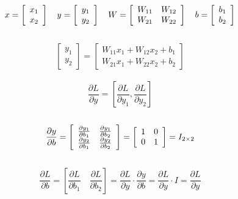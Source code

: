 \documentclass{article}
\begin{document}
\[x = \left[ \begin{array} { c } { x _ { 1 } } \\ { x _ { 2 } } \end{array} \right] \quad y = \left[ \begin{array} { l } { y _ { 1 } } \\ { y _ { 2 } } \end{array} \right] \quad W = \left[ \begin{array} { c c } { W _ { 11 } } & { W _ { 12 } } \\ { W _ { 21 } } & { W _ { 22 } } \end{array} \right] \quad b = \left[ \begin{array} { c } { b _ { 1 } } \\ { b _ { 2 } } \end{array} \right]\]
\\
\[\left[ \begin{array} { l } { y _ { 1 } } \\ { y _ { 2 } } \end{array} \right] = \left[ \begin{array} { c } { W _ { 11 } x _ { 1 } + W _ { 12 } x _ { 2 } + b _ { 1 } } \\ { W _ { 21 } x _ { 1 } + W _ { 22 } x _ { 2 } + b _ { 2 } } \end{array} \right]\]
\\
\[\frac { \partial L } { \partial y } = \left[ \frac { \partial L } { \partial y _ { 1 } } , \frac { \partial L } { \partial y _ { 2 } } \right]\]
\\
\[\frac { \partial y } { \partial b } = \left[ \begin{array} { c c } { \frac { \partial y _ { 1 } } { \partial b _ { 1 } } } & { \frac { \partial y _ { 1 } } { \partial b _ { 2 } } } \\ { \frac { \partial y _ { 2 } } { \partial b _ { 1 } } } & { \frac { \partial y _ { 2 } } { \partial b _ { 2 } } } \end{array} \right] = \left[ \begin{array} { l l } { 1 } & { 0 } \\ { 0 } & { 1 } \end{array} \right] = I _ { 2 \times 2 }\]
\\
\[\frac { \partial L } { \partial b } = \left[ \frac { \partial L } { \partial b _ { 1 } } \quad \frac { \partial L } { \partial b _ { 2 } } \right]= \frac { \partial L } { \partial y } \cdot \frac { \partial y } { \partial b } = \frac { \partial L } { \partial y } \cdot I = \frac { \partial L } { \partial y }\]
\end{document}
